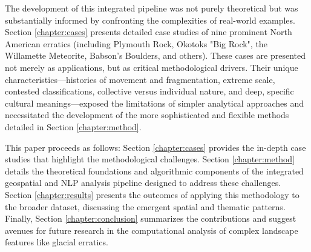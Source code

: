The development of this integrated pipeline was not purely theoretical but was substantially informed by confronting the complexities of real-world examples. Section \ref{chapter:cases} presents detailed case studies of nine prominent North American erratics (including Plymouth Rock, Okotoks "Big Rock", the Willamette Meteorite, Babson's Boulders, and others). These cases are presented not merely as applications, but as critical methodological drivers. Their unique characteristics—histories of movement and fragmentation, extreme scale, contested classifications, collective versus individual nature, and deep, specific cultural meanings—exposed the limitations of simpler analytical approaches and necessitated the development of the more sophisticated and flexible methods detailed in Section \ref{chapter:method}.

This paper proceeds as follows: Section \ref{chapter:cases} provides the in-depth case studies that highlight the methodological challenges. Section \ref{chapter:method} details the theoretical foundations and algorithmic components of the integrated geospatial and NLP analysis pipeline designed to address these challenges. Section \ref{chapter:results} presents the outcomes of applying this methodology to the broader dataset, discussing the emergent spatial and thematic patterns. Finally, Section \ref{chapter:conclusion} summarizes the contributions and suggest avenues for future research in the computational analysis of complex landscape features like glacial erratics.
